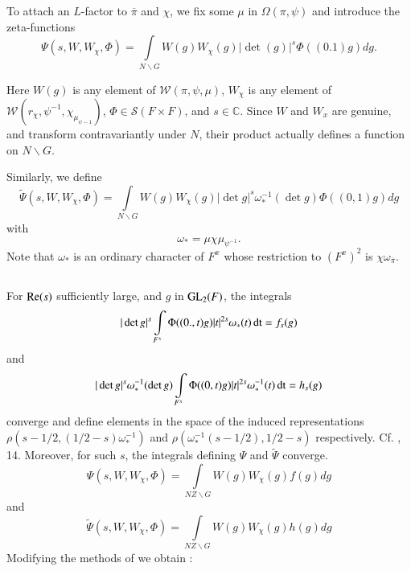 To attach an $L$-factor to $\overline{\pi}$ and $\chi$, we fix some $\mu$ in $\Omega(\pi,\psi)$ and introduce the zeta-functions
\setcounter{equation}{0}
\begin{equation}
\Psi (s,W,W_{\chi},\Phi)=\int\limits_{N\backslash G} W(g)W_{\chi}(g)|\det (g)|^{s}\Phi((0.1)g)dg.\label{art1-eq5.1.1}
\end{equation}

Here $W(g)$ is any element of $\mathscr{W}(\pi,\psi,\mu)$, $W_{\chi}$ is any element of\break $\mathscr{W}(r_{\chi},\psi^{-1},\chi_{\mu_{\psi-1}})$, $\Phi\in \mathscr{S}(F\times F)$, and $s\in \mathbb{C}$. Since $W$ and $W_{x}$ are genuine, and transform contravariantly under $N$, their product actually defines a function on $N\backslash G$.

Similarly, we define
\begin{equation}
\widetilde{\Psi}(s,W,W_{\chi},\Phi)=\int\limits_{N\backslash G}W(g)W_{\chi}(g)|\det g|^{s}\omega^{-1}_{*}(\det g)\Phi((0,1)g)dg\label{art1-eq5.1.2}
\end{equation}
with 
\begin{equation}
\omega_{*}=\mu \chi \mu_{\psi^{-1}}.\label{art1-eq5.1.3}
\end{equation}
Note that $\omega_{*}$ is an ordinary character of $F^{x}$ whose restriction to $(F^{x})^{2}$ is $\chi \omega_{\overline{\pi}}$.

\subsection{}\label{art1-sec5.2}\pageoriginale
For $\mathrm{Re}(s)$ sufficiently large, and $g$ in $\mathrm{GL}_{2}(F)$, the integrals
\setcounter{equation}{0}
\begin{equation}
|\det g|^{s}\int\limits_{F^{x}}\Phi ((0.,t)g)|t|^{2s}\omega_{*}(t)\operatorname{dt}=f_{s}(g)\label{art1-eq5.2.1}
\end{equation}
and
\begin{equation}
|\det g|^{s}\omega^{-1}_{*}(\det g)\int\limits_{F^{x}}\Phi((0,t)g)|t|^{2s}\omega^{-1}_{*}(t)\operatorname{dt} = h_{s}(g)\label{art1-eq5.2.2}
\end{equation}
converge and define elements in the space of the induced representations $\rho(s-1/2, (1/2-s)\omega^{-1}_{*})$ and $\rho(\omega^{-1}_{*}(s-1/2),1/2-s)$ respectively. Cf. \cite{Ja}, 14. Moreover, for such $s$, the integrals defining $\Psi$ and $\widetilde{\Psi}$ converge.
\begin{equation}
\Psi(s,W,W_{\chi},\Phi)=\int\limits_{NZ\backslash G}W(g)W_{\chi}(g)f(g)dg\label{art1-eq5.2.3}
\end{equation}
and
$$
\widetilde{\Psi}(s,W,W_{\chi},\Phi)=\int\limits_{NZ\backslash G}W(g)W_{\chi}(g)h(g)dg
$$
Modifying the methods of \cite{Ja} we obtain :

